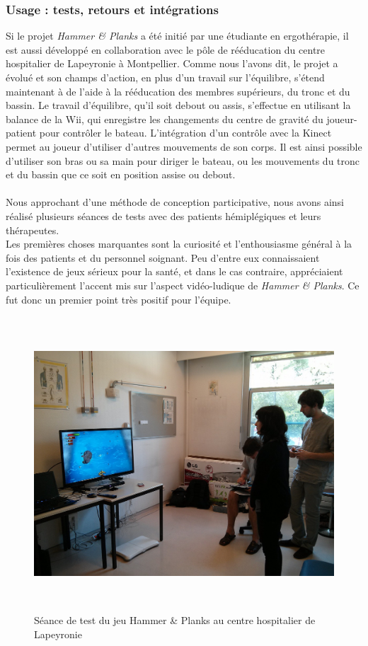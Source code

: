 	\subsubsection*{Usage : tests, retours et intégrations}
Si le projet \emph{Hammer \& Planks} a été initié par une étudiante en ergothérapie, il est aussi développé en collaboration avec le pôle de rééducation du centre hospitalier de Lapeyronie à Montpellier. Comme nous l'avons dit, le projet a évolué et son champs d'action, en plus d'un travail sur l'équilibre, s'étend maintenant à de l'aide à la rééducation des membres supérieurs, du tronc et du bassin. Le travail d'équilibre, qu'il soit debout ou assis, s'effectue en utilisant la balance de la Wii, qui enregistre les changements du centre de gravité du joueur-patient pour contrôler le bateau. L'intégration d'un contrôle avec la Kinect permet au joueur d'utiliser d'autres mouvements de son corps. Il est ainsi possible d'utiliser son bras ou sa main pour diriger le bateau, ou les mouvements du tronc et du bassin que ce soit en position assise ou debout.

\paragraph{} Nous approchant d'une méthode de conception participative, nous avons ainsi réalisé plusieurs séances de tests avec des patients hémiplégiques et leurs thérapeutes. \\
Les premières choses marquantes sont la curiosité et l'enthousiasme général à la fois des patients et du personnel soignant. Peu d'entre eux connaissaient l'existence de jeux sérieux pour la santé, et dans le cas contraire, appréciaient particulièrement l'accent mis sur l'aspect vidéo-ludique de \emph{Hammer \& Planks}. Ce fut donc un premier point très positif pour l'équipe.
\begin{figure}[hbt]
	\centering
	\includegraphics[height=11cm]{images/test_lapeyronie_3.jpg}
	\caption{Séance de test du jeu Hammer \& Planks au centre hospitalier de Lapeyronie}
	\label{test_lapeyronie}
\end{figure}
